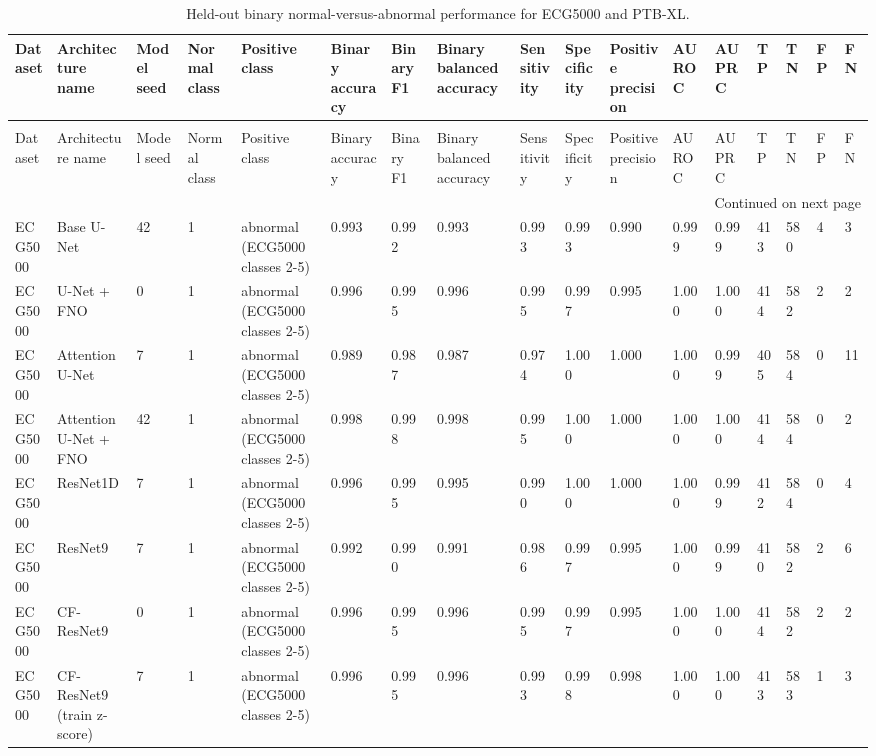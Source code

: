 \begin{longtable}{lllllllllllllllll}
\caption{Held-out binary normal-versus-abnormal performance for ECG5000 and PTB-XL.} \label{tab:binary_normal_abnormal_all_datasets} \\
\toprule
Dataset & Architecture name & Model seed & Normal class & Positive class & Binary accuracy & Binary F1 & Binary balanced accuracy & Sensitivity & Specificity & Positive precision & AUROC & AUPRC & TP & TN & FP & FN \\
\midrule
\endfirsthead
\caption[]{Held-out binary normal-versus-abnormal performance for ECG5000 and PTB-XL.} \\
\toprule
Dataset & Architecture name & Model seed & Normal class & Positive class & Binary accuracy & Binary F1 & Binary balanced accuracy & Sensitivity & Specificity & Positive precision & AUROC & AUPRC & TP & TN & FP & FN \\
\midrule
\endhead
\midrule
\multicolumn{17}{r}{Continued on next page} \\
\midrule
\endfoot
\bottomrule
\endlastfoot
ECG5000 & Base U-Net & 42 & 1 & abnormal (ECG5000 classes 2-5) & 0.993 & 0.992 & 0.993 & 0.993 & 0.993 & 0.990 & 0.999 & 0.999 & 413 & 580 & 4 & 3 \\
ECG5000 & U-Net + FNO & 0 & 1 & abnormal (ECG5000 classes 2-5) & 0.996 & 0.995 & 0.996 & 0.995 & 0.997 & 0.995 & 1.000 & 1.000 & 414 & 582 & 2 & 2 \\
ECG5000 & Attention U-Net & 7 & 1 & abnormal (ECG5000 classes 2-5) & 0.989 & 0.987 & 0.987 & 0.974 & 1.000 & 1.000 & 1.000 & 0.999 & 405 & 584 & 0 & 11 \\
ECG5000 & Attention U-Net + FNO & 42 & 1 & abnormal (ECG5000 classes 2-5) & 0.998 & 0.998 & 0.998 & 0.995 & 1.000 & 1.000 & 1.000 & 1.000 & 414 & 584 & 0 & 2 \\
ECG5000 & ResNet1D & 7 & 1 & abnormal (ECG5000 classes 2-5) & 0.996 & 0.995 & 0.995 & 0.990 & 1.000 & 1.000 & 1.000 & 0.999 & 412 & 584 & 0 & 4 \\
ECG5000 & ResNet9 & 7 & 1 & abnormal (ECG5000 classes 2-5) & 0.992 & 0.990 & 0.991 & 0.986 & 0.997 & 0.995 & 1.000 & 0.999 & 410 & 582 & 2 & 6 \\
ECG5000 & CF-ResNet9 & 0 & 1 & abnormal (ECG5000 classes 2-5) & 0.996 & 0.995 & 0.996 & 0.995 & 0.997 & 0.995 & 1.000 & 1.000 & 414 & 582 & 2 & 2 \\
ECG5000 & CF-ResNet9 (train z-score) & 7 & 1 & abnormal (ECG5000 classes 2-5) & 0.996 & 0.995 & 0.996 & 0.993 & 0.998 & 0.998 & 1.000 & 1.000 & 413 & 583 & 1 & 3 \\

\end{longtable}
